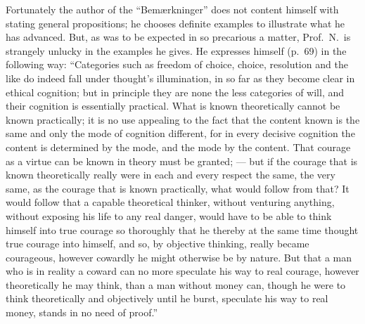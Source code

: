 \documentclass[12pt,a4paper]{book}
\newcommand{\opage}[1]{\marginnote{\footnotesize\textit{[#1]}}}
\begin{document}
Fortunately the author of the ``Bemærkninger'' does not content himself
\opage{62}with stating general propositions; he chooses definite examples to
illustrate what he has advanced. But, as was to be expected in so precarious a
matter, Prof.\ N.\ is strangely unlucky in the examples he gives. He expresses
himself (p.\ 69) in the following way: ``Categories such as freedom of choice,
choice, resolution and the like do indeed fall under thought's illumination, in
so far as they become clear in ethical cognition; but in principle they are
none the less categories of will, and their cognition is essentially practical.
What is known theoretically cannot be known practically; it is no use appealing
to the fact that the content known is the same and only the mode of cognition
different, for in every decisive cognition the content is determined by the
mode, and the mode by the content. That courage as a virtue can be known in
theory must be granted; --- but if the courage that is known theoretically
really were in each and every respect the same, the very same, as the courage
that is known practically, what would follow from that? It would follow that a
capable theoretical thinker, without venturing anything, without exposing his
life to any real danger, would have to be able to think himself into true
courage so thoroughly that he thereby at the same time thought true courage
into himself, and so, by objective thinking, really became courageous, however
cowardly he might otherwise be by nature. But that a man who is in reality a
coward can no more speculate his way to real courage, however theoretically he
may think, than a man without money can, though he
\opage{63}were to think theoretically and objectively until he burst,
speculate his way to real money, stands in no need of proof.''
\end{document}
